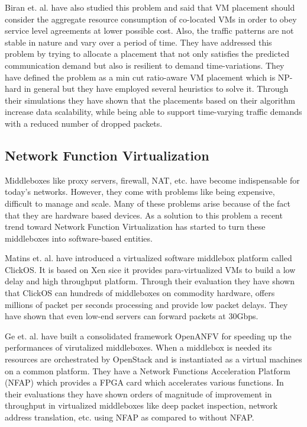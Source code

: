 Biran et. al. \cite{biran2012stable} have also studied this problem and said that VM placement should consider the aggregate resource consumption of co-located VMs in order to obey service level agreements at lower possible cost. Also, the traffic patterns are not stable in nature and vary over a period of time. They have addressed this problem by trying to allocate a placement that not only satisfies the predicted communication demand but also is resilient to demand time-variations. They have defined the problem as a min cut ratio-aware VM placement which is NP-hard in general but they have employed several heuristics to solve it. Through their simulations they have shown that the placements based on their algorithm increase data scalability, while being able to support time-varying traffic demands with a reduced number of dropped packets. 

\subsection{Network Function Virtualization}
Middleboxes like proxy servers, firewall, NAT, etc. have become indispensable for today's networks. However, they come with problems like being expensive, difficult to manage and scale. Many of these problems arise because of the fact that they are hardware based devices. As a solution to this problem a recent trend toward Network Function Virtualization has started to turn these middleboxes into software-based entities.

Matins et. al. \cite{martins2014clickos} have introduced a virtualized software middlebox platform called ClickOS. It is based on Xen sice it provides para-virtualized VMs to build a low delay and high throughput platform. Through their evaluation they have shown that ClickOS can hundreds of middleboxes on commodity hardware, offers millions of packet per seconds processing and provide low packet delays. They have shown that even low-end servers can forward packets at 30Gbps. 

Ge et. al. \cite{ge2014openanfv} have built a consolidated framework OpenANFV for speeding up the performances of virutalized middleboxes. When a middlebox is needed its resources are orchestrated by OpenStack and is instantiated as a virtual machines on a common platform. They have a Network Functions Acceleration Platform (NFAP) which provides a FPGA card which accelerates various functions. In their evaluations they have shown orders of magnitude of improvement in throughput in virtualized middleboxes like deep  packet inspection, network address translation, etc. using NFAP as compared to without NFAP.

